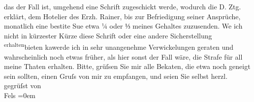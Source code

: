 \begin{ledgroupsized}[t]{13cm}
                    das der Fall ist, umgehend eine Schrift zugeschickt werde, wodurch die D. Ztg. erklärt, dem Hotelier des Erzh. Rainer, bis zur Befriedigung seiner Ansprüche,
                    monatlich eine besti{\geminationm}te Su{\geminationm}e etwa ¼ \introOben{}oder ⅓\introOben{} meines
                    Gehaltes zuzusenden. We{\geminationn} ich nicht in kürzester
                    Kürze diese Schrift oder eine andere Sicherstellung \substVorne{}\textsuperscript{erhalten}{\allowbreak}\substDazwischen{}bieten ka{\geminationn}\substHinten{}{ }{\pb}werde ich in sehr unangenehme
                    Verwickelungen geraten und wahrscheinlich noch etwas früher, als hier sonst der
                    Fall wäre, die Strafe für all meine Thaten erhalten.\pend
           \pstart
           Bitte, grüſsen Sie mir alle Beka{\geminationn}ten, die etwa noch
                    geneigt sein sollten, einen Gruſs von mir zu empfangen, und seien Sie selbst
                    herzl. gegrüſst\pend
           \pstart
           von{\\[\baselineskip]}\spacefill\mbox{Fels}\pend
           \leftskip=0em{}\endnumbering{}\end{ledgroupsized}  \newcommand{\dateiname}{L00198}\newcommand{\titel}{Friedrich M. Fels an Arthur Schnitzler, 20. 4. 1893}\newcommand{\editorInnen}{Martin Anton Müller und Gerd-Hermann Susen}
            \footnotesize
\begin{ledgroupsized}[t]{11.5cm}
\end{ledgroupsized}
         
      